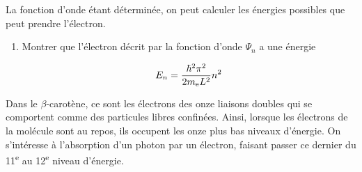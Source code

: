 \documentclass[a4paper,french,bookmarks]{article}
\begin{document}
La fonction d'onde étant déterminée, on peut calculer les énergies possibles que peut prendre l'électron.

\begin{enumerate}[resume]
    \item Montrer que l'électron décrit par la fonction d'onde $\Psi_n$ a une énergie
    
    \begin{equation}
        E_n = \dfrac{\hbar^2 \pi^2}{2m_\text e L^2} n^2
    \end{equation}
    
\end{enumerate}

Dans le $\beta$-carotène, ce sont les électrons des onze liaisons doubles qui se comportent comme des particules libres confinées. Ainsi, lorsque les électrons de la molécule sont au repos, ils occupent les onze plus bas niveaux d'énergie. On s'intéresse à l'absorption d'un photon par un électron, faisant passer ce dernier du 11\textsuperscript{e} au 12\textsuperscript{e} niveau d'énergie.
\end{document}
